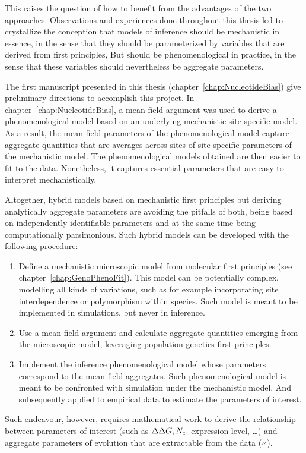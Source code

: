 This raises the question of how to benefit from the advantages of the two approaches.
Observations and experiences done throughout this thesis led to crystallize the conception that models of inference should be mechanistic in essence, in the sense that they should be parameterized by variables that are derived from first principles,
But should be phenomenological in practice, in the sense that these variables should nevertheless be aggregate parameters.

The first manuscript presented in this thesis (chapter~\ref{chap:NucleotideBias}) give preliminary directions to accomplish this project.
In chapter~\ref{chap:NucleotideBias}, a mean-field argument was used to derive a phenomenological model based on an underlying mechanistic site-specific model.
As a result, the mean-field parameters of the phenomenological model capture aggregate quantities that are averages across sites of site-specific parameters of the mechanistic model.
The phenomenological models obtained are then easier to fit to the data.
Nonetheless, it captures essential parameters that are easy to interpret mechanistically.

Altogether, hybrid models based on mechanistic first principles but deriving analytically aggregate parameters are avoiding the pitfalls of both, being based on independently identifiable parameters and at the same time being computationally parsimonious.
Such hybrid models can be developed with the following procedure:
\begin{enumerate}
    \item Define a mechanistic microscopic model from molecular first principles (see chapter~\ref{chap:GenoPhenoFit}).
        This model can be potentially complex, modelling all kinds of variations, such as for example incorporating site interdependence or polymorphism within species.
        Such model is meant to be implemented in simulations, but never in inference.
    \item Use a mean-field argument and calculate aggregate quantities emerging from the microscopic model, leveraging population genetics first principles.
    \item Implement the inference phenomenological model whose parameters correspond to the mean-field aggregates.
        Such phenomenological model is meant to be confronted with simulation under the mechanistic model.
        And subsequently applied to empirical data to estimate the parameters of interest.
\end{enumerate}
Such endeavour, however, requires mathematical work to derive the relationship between parameters of interest (such as $\Delta \Delta G, N_{\textrm{e}}, $ expression level, \ldots) and aggregate parameters of evolution that are extractable from the data ($\nu$).

